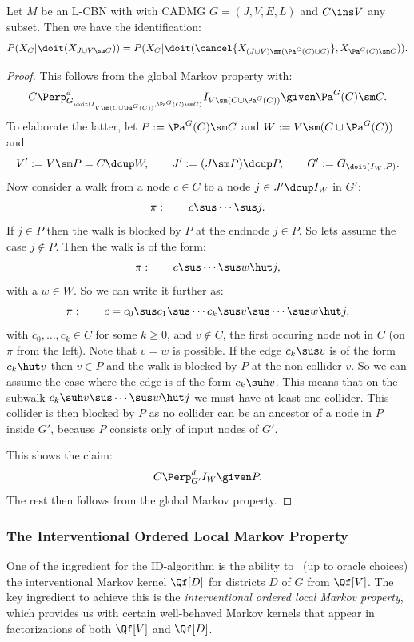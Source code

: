\begin{Lem}
    \label{lem:C-intPaC}
    Let $M$ be an L-CBN with with \observational CADMG $G=(J,V,E,L)$ and $C \ins V$ any subset.
    Then we have the identification:
    \[ P(X_C|\doit(X_{J \cup V \sm C})) = P(X_C|\doit(\cancel{X_{(J \cup V) \sm (\Pa^G(C) \cup C)}}, X_{\Pa^G(C)\sm C})). \]
    \begin{proof}
        This follows from the global Markov property with:
        \[ C \Perp^d_{G_{\doit(I_{V \sm (C \cup \Pa^G(C))},\Pa^G(C)\sm C)}} I_{V \sm (C \cup \Pa^G(C))} \given \Pa^G(C)\sm C.\]
        To elaborate the latter, let $P:=\Pa^G(C)\sm C$ and $W := V \sm (C \cup \Pa^G(C))$ and:
        \[ V':=V \sm P= C \dcup W, \qquad J':= (J\sm P) \dcup P, \qquad G':=G_{\doit(I_W,P)}.\]
        Now consider a walk from a node $c \in C$ to a node $j \in J' \dcup I_W$ in $G'$:
        \[\pi:\qquad c \sus \cdots \sus j.\]
        If $j \in P$ then the walk is blocked by $P$ at the endnode $j \in P$.
        So lets assume the case $j \notin P$. Then the walk is of the form:
        \[\pi:\qquad c \sus \cdots \sus w \hut j,\]
        with a $w \in W$. So we can write it further as:
        \[\pi:\qquad c =c_0 \sus c_1 \sus \cdots c_k \sus v \sus \cdots \sus w \hut j,\]
        with $c_0,\dots,c_k \in C$ for some $k \ge 0$, and $v \notin C$, the first occuring node not in $C$ (on $\pi$ from the left). 
        Note that $v=w$ is possible.
        If the edge $c_k \sus v$ is of the form $c_k \hut v$ then $v \in P$ and the walk is blocked by $P$ at the non-collider $v$.
        So we can assume the case where the edge is of the form $c_k \suh v$. 
        This means that on the subwalk $c_k \suh v \sus \cdots \sus w \hut j$ we must have at least one collider.
        This collider is then blocked by $P$ as no collider can be an ancestor of a node in $P$ inside $G'$, because $P$ consists only of input nodes of $G'$. 

        This shows the claim:
        \[ C \Perp^d_{G'} I_W \given P.\]
        The rest then follows from the global Markov property.
    \end{proof}
\end{Lem}


\subsubsection{The Interventional Ordered Local Markov Property}

One of the ingredient for the ID-algorithm is the ability to \track\ (up to oracle choices) 
the interventional Markov kernel $\Qf[D]$  for districts $D$ of $G$ from $\Qf[V]$.
The key ingredient to achieve this is the \emph{interventional ordered local Markov property}, which
provides us with certain well-behaved Markov kernels that appear in factorizations of both $\Qf[V]$ and $\Qf[D]$.

